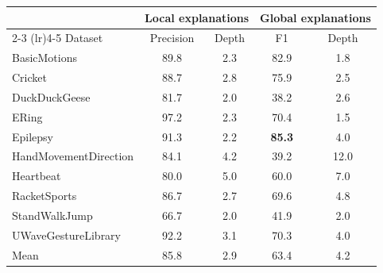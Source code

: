 \begin{tabular}{lcccc}
\toprule
& \multicolumn{2}{c}{Local explanations} & \multicolumn{2}{c}{Global explanations} \\
\cmidrule(lr){2-3} \cmidrule(lr){4-5}
Dataset & Precision & Depth & F1 & Depth \\
\midrule
BasicMotions & 89.8 & 2.3 & 82.9 & 1.8 \\
Cricket & 88.7 & 2.8 & 75.9 & 2.5 \\
DuckDuckGeese & 81.7 & 2.0 & 38.2 & 2.6 \\
ERing & 97.2 & 2.3 & 70.4 & 1.5 \\
Epilepsy & 91.3 & 2.2 & \textbf{85.3} & 4.0 \\
HandMovementDirection & 84.1 & 4.2 & 39.2 & 12.0 \\
Heartbeat & 80.0 & 5.0 & 60.0 & 7.0 \\
RacketSports & 86.7 & 2.7 & 69.6 & 4.8 \\
StandWalkJump & 66.7 & 2.0 & 41.9 & 2.0 \\
UWaveGestureLibrary & 92.2 & 3.1 & 70.3 & 4.0 \\
\midrule
Mean & 85.8 & 2.9 & 63.4 & 4.2 \\
\bottomrule
\end{tabular}
